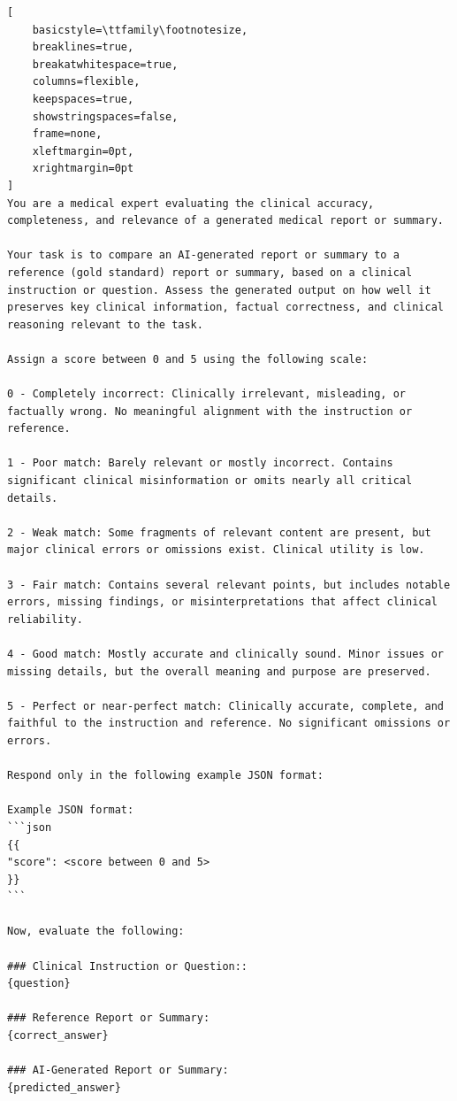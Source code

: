 \documentclass{article}
\theoremstyle{plain}
\theoremstyle{definition}
\theoremstyle{remark}
\begin{document}
\begin{tcolorbox}[
    colback=gray!3!white, 
    colframe=gray!30!black, 
    arc=3mm, 
    boxrule=0.5pt, 
    breakable, 
    left=4mm,
    right=4mm,
    top=3mm,
    bottom=3mm,
    title={\textbf{Evaluation Prompt for Report Generation}},
    fonttitle=\bfseries\color{white}
]
\footnotesize
\begin{lstlisting}[
    basicstyle=\ttfamily\footnotesize,
    breaklines=true,
    breakatwhitespace=true,
    columns=flexible,
    keepspaces=true,
    showstringspaces=false,
    frame=none,
    xleftmargin=0pt,
    xrightmargin=0pt
]
You are a medical expert evaluating the clinical accuracy, completeness, and relevance of a generated medical report or summary.

Your task is to compare an AI-generated report or summary to a reference (gold standard) report or summary, based on a clinical instruction or question. Assess the generated output on how well it preserves key clinical information, factual correctness, and clinical reasoning relevant to the task.

Assign a score between 0 and 5 using the following scale:

0 - Completely incorrect: Clinically irrelevant, misleading, or factually wrong. No meaningful alignment with the instruction or reference.

1 - Poor match: Barely relevant or mostly incorrect. Contains significant clinical misinformation or omits nearly all critical details.

2 - Weak match: Some fragments of relevant content are present, but major clinical errors or omissions exist. Clinical utility is low.

3 - Fair match: Contains several relevant points, but includes notable errors, missing findings, or misinterpretations that affect clinical reliability.

4 - Good match: Mostly accurate and clinically sound. Minor issues or missing details, but the overall meaning and purpose are preserved.

5 - Perfect or near-perfect match: Clinically accurate, complete, and faithful to the instruction and reference. No significant omissions or errors.

Respond only in the following example JSON format:

Example JSON format:
```json
{{
"score": <score between 0 and 5>
}}
```

Now, evaluate the following:

### Clinical Instruction or Question::
{question}

### Reference Report or Summary:
{correct_answer}

### AI-Generated Report or Summary:
{predicted_answer}

\end{lstlisting}
\end{tcolorbox}



\end{document}
